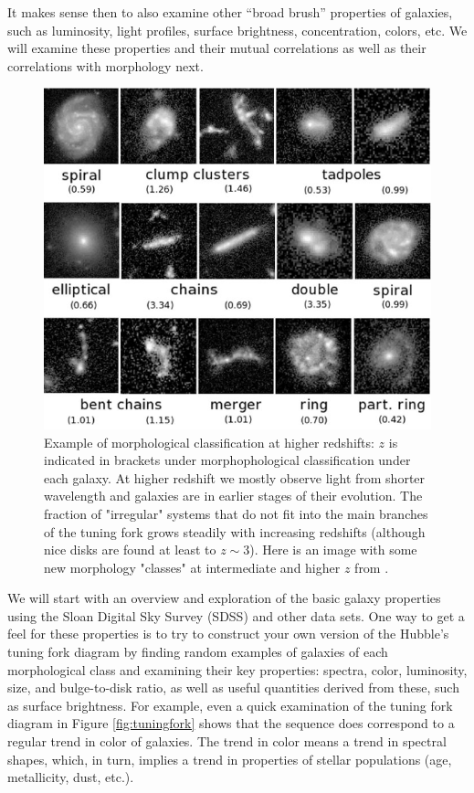 It makes sense then to also examine other ``broad brush'' properties of galaxies, such as luminosity, light profiles, surface brightness, concentration, colors, etc.  We will examine these properties and their mutual correlations as well as their correlations with morphology next. 

\begin{figure}[t]
\centerline{%
\includegraphics[scale=0.6]{fig/highz_morphology.jpg}}
\caption{Example of morphological classification at higher redshifts: $z$ is indicated in brackets under morphophological classification under each galaxy. At higher redshift we mostly observe light from shorter wavelength and galaxies are in earlier stages of their evolution. The fraction of "irregular" systems that do not fit into the main branches of the tuning fork grows steadily with increasing redshifts (although nice disks are found at least to $z\sim 3$). Here is an image with some new morphology "classes" at intermediate and higher $z$ from \protect\citep[][see \href{http://ned.ipac.caltech.edu/level5/Sept11/Buta/Buta_contents.html}{here} for the online version]{buta11}. \label{fig:highz_morph}}
\end{figure}

We will start with an overview and exploration of the basic galaxy properties using the Sloan Digital Sky Survey (SDSS) and other data sets. 
One way to get a feel for these properties is to try to construct your own version of the Hubble's tuning fork diagram by finding random examples of galaxies of each morphological 
class and examining their key properties: spectra, color, luminosity, size, and bulge-to-disk ratio, as well as useful quantities derived from these, such as surface brightness. 
For example, even a quick examination of the tuning fork diagram in  
 Figure \ref{fig:tuningfork} shows that the sequence does correspond to 
a regular trend in color of galaxies. The trend in color means a trend in spectral shapes, which, in turn, implies a trend in properties of stellar populations (age, metallicity, dust, etc.). 

